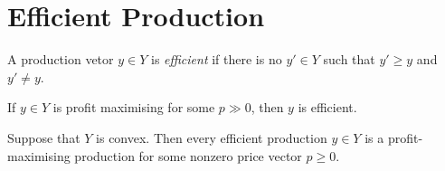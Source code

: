 \section{Efficient Production}

\begin{defn}
    A production vetor $y \in Y$ is \emph{efficient} if there is no $y' \in Y$ such that $y' \geq y$ and $y' \neq y$.
\end{defn}

\begin{prop}
    If $y \in Y$ is profit maximising for some $p \gg 0$, then $y$ is efficient.
\end{prop}

\begin{prop}
    Suppose that $Y$ is convex. Then every efficient production $y \in Y$ is a profit-maximising production for some nonzero price vector $p \geq 0$.
\end{prop}
